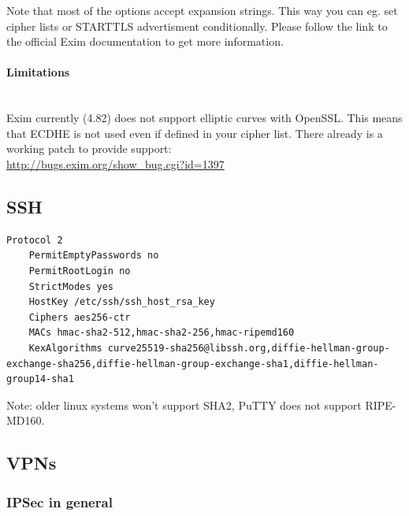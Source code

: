 Note that most of the options accept expansion strings. This way you can eg. set cipher lists or STARTTLS advertisment conditionally. Please follow the link to the official Exim documentation to get more information.

\paragraph*{Limitations}\mbox{}\\

Exim currently (4.82) does not support elliptic curves with OpenSSL. This means that ECDHE is not used even if defined in your cipher list.
There already is a working patch to provide support:\\
\url{http://bugs.exim.org/show_bug.cgi?id=1397}



\subsection{SSH}

\begin{lstlisting}[breaklines]
	Protocol 2
	PermitEmptyPasswords no
	PermitRootLogin no
	StrictModes yes
	HostKey /etc/ssh/ssh_host_rsa_key
	Ciphers aes256-ctr
	MACs hmac-sha2-512,hmac-sha2-256,hmac-ripemd160
	KexAlgorithms curve25519-sha256@libssh.org,diffie-hellman-group-exchange-sha256,diffie-hellman-group-exchange-sha1,diffie-hellman-group14-sha1
\end{lstlisting}

Note: older linux systems won't support SHA2, PuTTY does not support RIPE-MD160.
\\


\subsection{VPNs}
\subsubsection{IPSec in general}
\label{section:IPSECgeneral}


 \\
 \\

